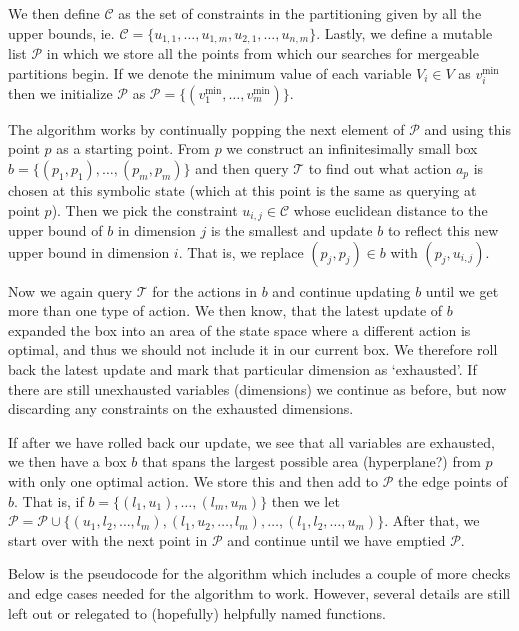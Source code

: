 \documentclass{article}
\begin{document}
We then define $\mathcal{C}$ as the set of constraints in the partitioning given
by all the upper bounds, ie. $\mathcal{C} = \{ u_{1,1}, \ldots, u_{1,m},
u_{2,1}, \ldots, u_{n, m} \}$. Lastly, we define a mutable list $\mathcal{P}$ in
which we store all the points from which our searches for mergeable partitions
begin. If we denote the minimum value of each variable $V_i \in V$ as
$v^{\min}_i$ then we initialize $\mathcal{P}$ as $\mathcal{P} = \{ (v^{\min}_1,
\ldots, v^{\min}_m) \}$.

The algorithm works by continually popping the next element of $\mathcal{P}$ and
using this point $p$ as a starting point. From $p$ we construct an
infinitesimally small box $b = \{ (p_1, p_1), \ldots, (p_m,p_m) \}$ and then
query $\mathcal{T}$ to find out what action $a_p$ is chosen at this symbolic
state (which at this point is the same as querying at point $p$). Then we pick
the constraint $u_{i,j} \in \mathcal{C}$ whose euclidean distance to the upper
bound of $b$ in dimension $j$ is the smallest and update $b$ to reflect this new
upper bound in dimension $i$. That is, we replace $(p_j, p_j) \in b$ with $(p_j,
u_{i,j})$.

Now we again query $\mathcal{T}$ for the actions in $b$ and continue updating
$b$ until we get more than one type of action. We then know, that the latest
update of $b$ expanded the box into an area of the state space where a different
action is optimal, and thus we should not include it in our current box. We
therefore roll back the latest update and mark that particular dimension as
`exhausted'. If there are still unexhausted variables (dimensions) we continue
as before, but now discarding any constraints on the exhausted dimensions.

If after we have rolled back our update, we see that all variables are
exhausted, we then have a box $b$ that spans the largest possible area
(hyperplane?) from $p$ with only one optimal action. We store this and then add
to $\mathcal{P}$ the edge points of $b$. That is, if $b = \{ (l_{1},
u_{1}), \ldots, (l_{m}, u_{m}) \}$ then we let $\mathcal{P} = \mathcal{P} \cup
\{ (u_{1}, l_{2}, \ldots, l_{m}), (l_{1}, u_{2}, \ldots, l_{m}), \ldots, (l_{1},
l_{2}, \ldots, u_{m}) \}$. After that, we start over with the next point in
$\mathcal{P}$ and continue until we have emptied $\mathcal{P}$.

Below is the pseudocode for the algorithm which includes a couple of more checks
and edge cases needed for the algorithm to work. However, several details are
still left out or relegated to (hopefully) helpfully named functions.
\end{document}
